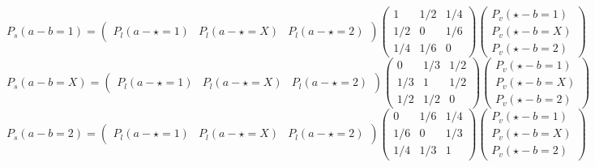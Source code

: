 {\footnotesize $$P_{s}(a-b=1)=
	\left(\begin{array}{ccc}
	P_{l}(a - \star=1) & P_{l}(a - \star=X) & P_{l}(a - \star=2)
	\end{array} \right)
	\left(\begin{array}{ccc}
	1 & 1/2 & 1/4\\
	1/2 & 0 & 1/6\\
	1/4 & 1/6 & 0
	\end{array} \right)
	\left(\begin{array}{c}
	P_{v}(\star - b=1)\\
	P_{v}(\star - b=X)\\
	P_{v}(\star - b=2)
	\end{array} \right)
	$$
	$$P_{s}(a-b=X)=
	\left(\begin{array}{ccc}
	P_{l}(a - \star=1) & P_{l}(a - \star=X) & P_{l}(a - \star=2)
	\end{array} \right)
	\left(\begin{array}{ccc}
	0 & 1/3 & 1/2\\
	1/3 & 1 & 1/2\\
	1/2 & 1/2 & 0
	\end{array} \right)
	\left(\begin{array}{c}
	P_{v}(\star - b=1)\\
	P_{v}(\star - b=X)\\
	P_{v}(\star - b=2)
	\end{array} \right)
	$$
	$$P_{s}(a-b=2)=
	\left(\begin{array}{ccc}
	P_{l}(a - \star=1) & P_{l}(a - \star=X) & P_{l}(a - \star=2)
	\end{array} \right)
	\left(\begin{array}{ccc}
	0 & 1/6 & 1/4\\
	1/6 & 0 & 1/3\\
	1/4 & 1/3 & 1
	\end{array} \right)
	\left(\begin{array}{c}
	P_{v}(\star - b=1)\\
	P_{v}(\star - b=X)\\
	P_{v}(\star - b=2)
	\end{array} \right)
	$$}
\newpage
